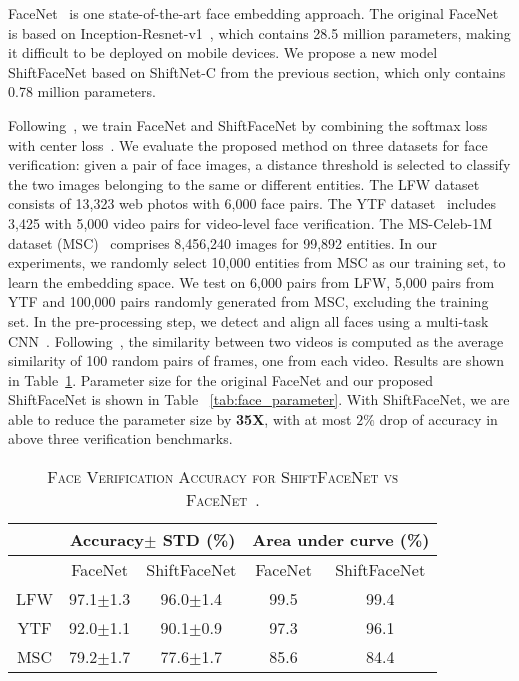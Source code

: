 \documentclass[10pt,twocolumn,letterpaper]{article}
\begin{document}
FaceNet~\cite{schroff2015facenet} is one state-of-the-art face embedding approach. The original FaceNet is based on Inception-Resnet-v1~\cite{szegedy2016rethinking}, which contains 28.5 million parameters, making it difficult to be deployed on mobile devices. We propose a new model ShiftFaceNet based on ShiftNet-C from the previous section, which only contains 0.78 million parameters. 

Following~\cite{parkhi2015deep}, we train FaceNet and ShiftFaceNet by combining the softmax loss with center loss~\cite{wen2016discriminative}. We evaluate the proposed method on three datasets for face verification: given a pair of face images, a distance threshold is selected to classify the two images belonging to the same or different entities. The LFW dataset~\cite{huang2007labeled} consists of 13,323 web photos with 6,000 face pairs.
The YTF dataset~\cite{wolf2011face} includes 3,425 with 5,000 video pairs for video-level face verification.
The MS-Celeb-1M dataset (MSC)~\cite{guo2016ms} comprises 8,456,240 images for 99,892 entities.
In our experiments, we randomly select 10,000 entities from MSC as our training set, to learn the embedding space. We test on 6,000 pairs from LFW, 5,000 pairs from YTF and 100,000 pairs randomly generated from MSC, excluding the training set.
In the pre-processing step, we detect and align all faces using a multi-task CNN~\cite{zhang2016joint}.
Following~\cite{schroff2015facenet},
the similarity between two videos is computed as the average similarity of 100 random pairs of frames, one from each video. Results are shown in Table~\ref{tab:face_accuracy}. Parameter size for the original FaceNet and our proposed ShiftFaceNet is shown in Table ~\ref{tab:face_parameter}. With ShiftFaceNet, we are able to reduce the parameter size by \textbf{35X}, with at most $2\%$ drop of accuracy in above three verification benchmarks. 

\begin{table}
\small
\caption{\textsc{Face Verification Accuracy for ShiftFaceNet vs FaceNet~\cite{schroff2015facenet}.}}
\vspace{-0.1in}
\label{tab:face_accuracy}
\begin{tabular}{c | c c | c c}
 & \multicolumn{2}{c|}{Accuracy$\pm$ STD (\%)} & \multicolumn{2}{c}{Area under curve (\%)} \\
\hline
 & FaceNet & ShiftFaceNet & FaceNet & ShiftFaceNet \\
LFW & 97.1$\pm$1.3 & 96.0$\pm$1.4 & 99.5 & 99.4\\
YTF & 92.0$\pm$1.1 & 90.1$\pm$0.9 & 97.3 & 96.1\\
MSC & 79.2$\pm$1.7 & 77.6$\pm$1.7 & 85.6 & 84.4\\
\end{tabular}
\end{table}
\end{document}
